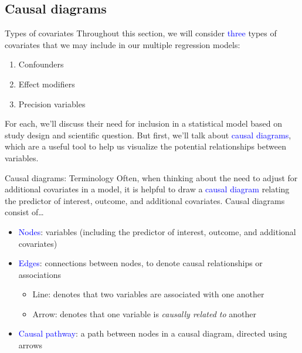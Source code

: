 \documentclass[10pt,t]{beamer}
\begin{document}
\subsection{Causal diagrams}

\begin{frame}{Types of covariates}
Throughout this section, we will consider \textcolor{blue}{three} types of covariates that we may include in our multiple regression models:

\vspace{0.3cm}

\begin{enumerate}
	\item Confounders
	\item Effect modifiers
	\item Precision variables
\end{enumerate}

\vspace{0.3cm}

For each, we'll discuss their need for inclusion in a statistical model based on study design and scientific question. But first, we'll talk about \textcolor{blue}{causal diagrams}, which are a useful tool to help us visualize the potential relationships between variables.

\end{frame}

\begin{frame}{Causal diagrams: Terminology}
Often, when thinking about the need to adjust for additional covariates in a model, it is helpful to draw a \textcolor{blue}{causal diagram} relating the predictor of interest, outcome, and additional covariates. Causal diagrams consist of\dots

\vspace{0.3cm}

\begin{itemize}
	\item \textcolor{blue}{Nodes}: variables (including the predictor of interest, outcome, and additional covariates) \pause
	\medskip
	
	\item \textcolor{blue}{Edges}: connections between nodes, to denote causal relationships or associations \pause
	\medskip
	
	\begin{itemize}
		\item Line: denotes that two variables are associated with one another
		\medskip
		
		\item Arrow: denotes that one variable is \textit{causally related to} another
	\end{itemize} \pause
\medskip
\item \textcolor{blue}{Causal pathway}: a path between nodes in a causal diagram, directed using arrows
\end{itemize}
\end{frame}
\end{document}
